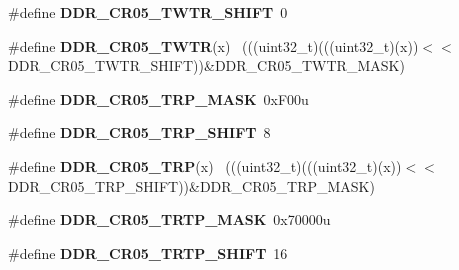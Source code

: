 \begin{DoxyCompactItemize}
\item 
\hypertarget{group___d_d_r___register___masks_ga70ccb6f106934917e0e2a90d7deebec3}{}\#define {\bfseries D\+D\+R\+\_\+\+C\+R05\+\_\+\+T\+W\+T\+R\+\_\+\+S\+H\+I\+F\+T}~0\label{group___d_d_r___register___masks_ga70ccb6f106934917e0e2a90d7deebec3}

\item 
\hypertarget{group___d_d_r___register___masks_ga2ff81b69ccfb07dc33911f7e852e52f0}{}\#define {\bfseries D\+D\+R\+\_\+\+C\+R05\+\_\+\+T\+W\+T\+R}(x)                                              ~(((uint32\+\_\+t)(((uint32\+\_\+t)(x))$<$$<$D\+D\+R\+\_\+\+C\+R05\+\_\+\+T\+W\+T\+R\+\_\+\+S\+H\+I\+F\+T))\&D\+D\+R\+\_\+\+C\+R05\+\_\+\+T\+W\+T\+R\+\_\+\+M\+A\+S\+K)\label{group___d_d_r___register___masks_ga2ff81b69ccfb07dc33911f7e852e52f0}

\item 
\hypertarget{group___d_d_r___register___masks_gaae6840c185893c9c3262490219c85785}{}\#define {\bfseries D\+D\+R\+\_\+\+C\+R05\+\_\+\+T\+R\+P\+\_\+\+M\+A\+S\+K}~0x\+F00u\label{group___d_d_r___register___masks_gaae6840c185893c9c3262490219c85785}

\item 
\hypertarget{group___d_d_r___register___masks_ga8c3478b0d757f1834423db8a75b37578}{}\#define {\bfseries D\+D\+R\+\_\+\+C\+R05\+\_\+\+T\+R\+P\+\_\+\+S\+H\+I\+F\+T}~8\label{group___d_d_r___register___masks_ga8c3478b0d757f1834423db8a75b37578}

\item 
\hypertarget{group___d_d_r___register___masks_ga2654d77e7c0a0fa3d383866ae6ac1dc5}{}\#define {\bfseries D\+D\+R\+\_\+\+C\+R05\+\_\+\+T\+R\+P}(x)                                                ~(((uint32\+\_\+t)(((uint32\+\_\+t)(x))$<$$<$D\+D\+R\+\_\+\+C\+R05\+\_\+\+T\+R\+P\+\_\+\+S\+H\+I\+F\+T))\&D\+D\+R\+\_\+\+C\+R05\+\_\+\+T\+R\+P\+\_\+\+M\+A\+S\+K)\label{group___d_d_r___register___masks_ga2654d77e7c0a0fa3d383866ae6ac1dc5}

\item 
\hypertarget{group___d_d_r___register___masks_gae7a172b1a6cd252868abb731d19c8108}{}\#define {\bfseries D\+D\+R\+\_\+\+C\+R05\+\_\+\+T\+R\+T\+P\+\_\+\+M\+A\+S\+K}~0x70000u\label{group___d_d_r___register___masks_gae7a172b1a6cd252868abb731d19c8108}

\item 
\hypertarget{group___d_d_r___register___masks_gaa842aa5a893185a910aaec4b859412f1}{}\#define {\bfseries D\+D\+R\+\_\+\+C\+R05\+\_\+\+T\+R\+T\+P\+\_\+\+S\+H\+I\+F\+T}~16\label{group___d_d_r___register___masks_gaa842aa5a893185a910aaec4b859412f1}


\end{DoxyCompactItemize}
